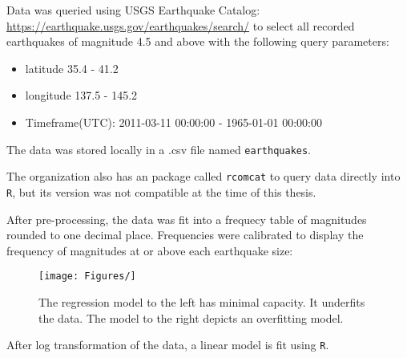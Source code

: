 

Data was queried using USGS Earthquake Catalog:
\url{https://earthquake.usgs.gov/earthquakes/search/} to select all
recorded earthquakes of magnitude 4.5 and above with the following query
parameters:

\begin{itemize}
\tightlist
\item
  latitude 35.4 - 41.2
\item
  longitude 137.5 - 145.2
\item
  Timeframe(UTC): 2011-03-11 00:00:00 - 1965-01-01 00:00:00
\end{itemize}

The data was stored locally in a .csv file named \texttt{earthquakes}.

The organization also has an package called \texttt{rcomcat} to query
data directly into \texttt{R}, but its version was not compatible at the
time of this thesis.

After pre-processing, the data was fit into a frequecy table of magnitudes rounded to one decimal place.  Frequencies were calibrated to display the frequency of magnitudes at or above each earthquake size:

\begin{figure}[H]
    \texttt{[image: Figures/]}
    \vspace{-20pt}
    \caption{\footnotesize{The regression model to the left has minimal capacity.  It underfits the data. The model to the right depicts an overfitting model.}}
    \label{capacityviz}
\end{figure}



\begin{comment}
\hypertarget{linear-models-of-the-data}{%
\subsection{Linear models of the data}\label{linear-models-of-the-data}}
\end{comment}

After log transformation of the data, a linear model is fit using
\texttt{R}.

\begin{Shaded}
\begin{Highlighting}[]
\OtherTok{\textless{}{-}}\SpecialCharTok{\%\textgreater{}\%} \NormalTok{(} 

\OtherTok{\textless{}{-}} \NormalTok{(}\SpecialCharTok{\textasciitilde{}}

\end{Highlighting}
\end{Shaded}

